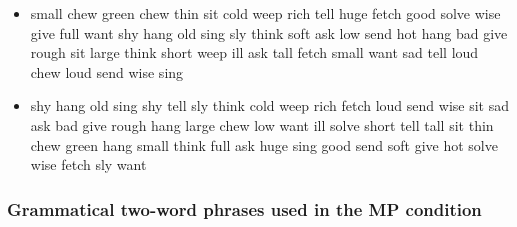 \documentclass[11pt,a4wide]{article}
\begin{document}
\begin{itemize}
  \item small chew green chew thin sit cold weep rich tell huge fetch
    good solve wise give full want shy hang old sing sly think soft
    ask low send hot hang bad give rough sit large think short weep
    ill ask tall fetch small want sad tell loud chew loud send wise
    sing

  \item shy hang old sing shy tell sly think cold weep rich fetch loud
    send wise sit sad ask bad give rough hang large chew low want ill
    solve short tell tall sit thin chew green hang small think full
    ask huge sing good send soft give hot solve wise fetch sly want

\end{itemize}

\subsubsection*{Grammatical two-word phrases used in the MP condition}
\end{document}

